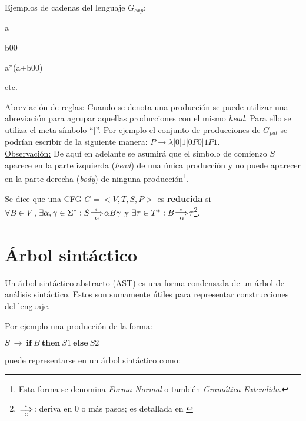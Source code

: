 \begin{enumerate}
Ejemplos de cadenas del lenguaje $G_{exp}$:
\begin{items}
\item a
\item b00
\item a*(a+b00)
\item etc.
\end{items}

\end{enumerate}

\underline{Abreviación de reglas}: Cuando se denota una producción se puede utilizar una abreviación para agrupar aquellas producciones con el mismo \textit{head}. Para ello se utiliza el meta-símbolo ``|''. Por ejemplo el conjunto de producciones de $G_{pal}$ se podrían escribir de la siguiente manera: $P \rightarrow \lambda | 0 | 1 | 0P0 | 1P1$.\\


\underline{Observación:}
De aquí en adelante se asumirá que el símbolo de comienzo $S$ aparece en la parte izquierda (\textit{head}) de una única producción y no puede aparecer en la parte derecha (\textit{body}) de ninguna producción\footnote{Esta forma se denomina \emph{Forma Normal} o también \textit{Gramática Extendida}.}. \\


\begin{definition} Se dice que una CFG $G = < V,T,S,P>$
es \textbf{reducida} si\\
$\forall B \in V$ , $\exists \alpha , \gamma \in \Sigma^{*} : S \clausderiva{G} \alpha B \gamma$ y $\exists \tau \in T^{*} : B \clausderiva{G} \tau$\footnote{ $\clausderiva{G}$: deriva en $0$ o más pasos; es detallada en \cite{tesismarcelo}}.
\label{def:reducida}
\end{definition}

\section{Árbol sintáctico}

Un árbol sintáctico abstracto (AST) es una forma condensada de un árbol de análisis sintáctico. Estos son sumamente útiles para representar construcciones del lenguaje.

Por ejemplo una producción de la forma:
\begin{center}\large
$S\ \rightarrow\ \textbf{if}\ B\ \textbf{then}\ S1\ \textbf{else}\ S2$                                                                      \end{center}
puede representarse en un árbol sintáctico como:

